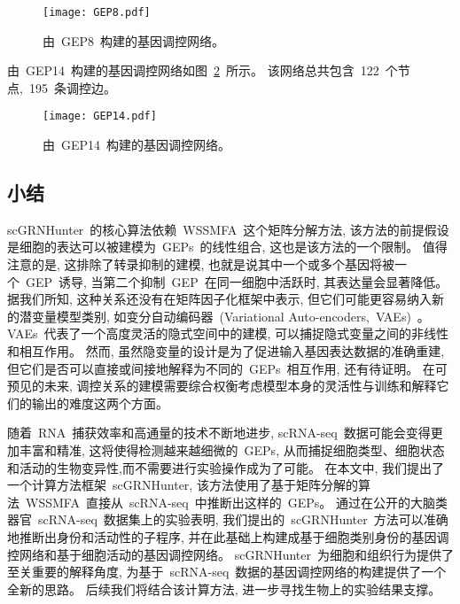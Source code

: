 \begin{figure}[!htbp]
    \centering
    \texttt{[image: GEP8.pdf]}
    \caption{由~GEP8~构建的基因调控网络。}
    \label{fig:gep-grn-gep8}
\end{figure}

由~GEP14~构建的基因调控网络如图~\ref{fig:gep-grn-gep14}~所示。
该网络总共包含~122~个节点,~195~条调控边。
\begin{figure}[!htbp]
    \centering
    \texttt{[image: GEP14.pdf]}
    \caption{由~GEP14~构建的基因调控网络。}
    \label{fig:gep-grn-gep14}
\end{figure}


\subsection{小结}
scGRNHunter~的核心算法依赖~WSSMFA~这个矩阵分解方法,
该方法的前提假设是细胞的表达可以被建模为~GEPs~的线性组合,
这也是该方法的一个限制。
值得注意的是, 这排除了转录抑制的建模, 也就是说其中一个或多个基因将被一个~GEP~诱导,
当第二个抑制~GEP~在同一细胞中活跃时, 其表达量会显著降低。
据我们所知, 这种关系还没有在矩阵因子化框架中表示, 但它们可能更容易纳入新的潜变量模型类别,
如变分自动编码器~(Variational Auto-encoders,~VAEs)~\cite{ding2018interpretable,gronbech2018scvae}。
VAEs~代表了一个高度灵活的隐式空间中的建模, 可以捕捉隐式变量之间的非线性和相互作用。
然而, 虽然隐变量的设计是为了促进输入基因表达数据的准确重建, 
但它们是否可以直接或间接地解释为不同的~GEPs~相互作用, 还有待证明。
在可预见的未来, 调控关系的建模需要综合权衡考虑模型本身的灵活性与训练和解释它们的输出的难度这两个方面。

随着~RNA~捕获效率和高通量的技术不断地进步, scRNA-seq~数据可能会变得更加丰富和精准,
这将使得检测越来越细微的~GEPs, 从而捕捉细胞类型、细胞状态和活动的生物变异性,而不需要进行实验操作成为了可能。
在本文中, 我们提出了一个计算方法框架~scGRNHunter,
该方法使用了基于矩阵分解的算法~WSSMFA~直接从~scRNA-seq~中推断出这样的~GEPs。 
通过在公开的大脑类器官~scRNA-seq~数据集上的实验表明,
我们提出的~scGRNHunter~方法可以准确地推断出身份和活动性的子程序, 
并在此基础上构建成基于细胞类别身份的基因调控网络和基于细胞活动的基因调控网络。
scGRNHunter~为细胞和组织行为提供了至关重要的解释角度,
为基于~scRNA-seq~数据的基因调控网络的构建提供了一个全新的思路。
后续我们将结合该计算方法, 进一步寻找生物上的实验结果支撑。